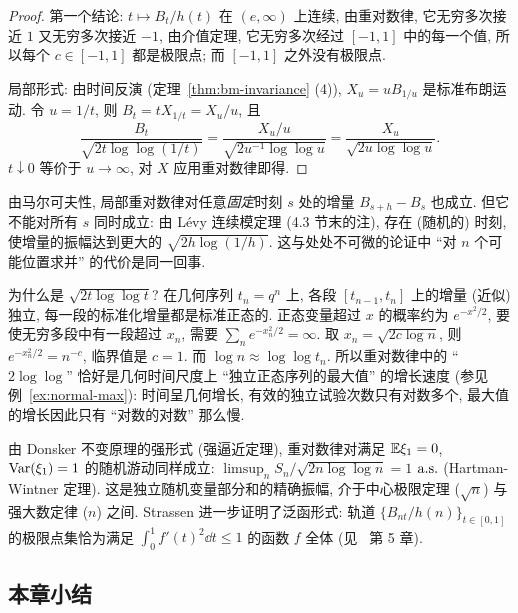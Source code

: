 \begin{proof}
第一个结论: $t\mapsto B_t/h(t)$ 在 $(e,\infty)$ 上连续, 由重对数律, 它无穷多次接近 $1$ 又无穷多次接近 $-1$, 由介值定理, 它无穷多次经过 $[-1,1]$ 中的每一个值, 所以每个 $c\in[-1,1]$ 都是极限点; 而 $[-1,1]$ 之外没有极限点.

局部形式: 由时间反演 (定理~\ref{thm:bm-invariance} (4)), $X_u=uB_{1/u}$ 是标准布朗运动. 令 $u=1/t$, 则 $B_t=tX_{1/t}=X_u/u$, 且
\[
\frac{B_t}{\sqrt{2t\log\log(1/t)}}=\frac{X_u/u}{\sqrt{2u^{-1}\log\log u}}=\frac{X_u}{\sqrt{2u\log\log u}}.
\]
$t\downarrow0$ 等价于 $u\to\infty$, 对 $X$ 应用重对数律即得.
\end{proof}

由马尔可夫性, 局部重对数律对任意\emph{固定}时刻 $s$ 处的增量 $B_{s+h}-B_s$ 也成立. 但它不能对所有 $s$ 同时成立: 由 L\'evy 连续模定理 (4.3 节末的注), 存在 (随机的) 时刻, 使增量的振幅达到更大的 $\sqrt{2h\log(1/h)}$. 这与处处不可微的论证中 ``对 $n$ 个可能位置求并'' 的代价是同一回事.

\begin{intuition}
为什么是 $\sqrt{2t\log\log t}$? 在几何序列 $t_n=q^n$ 上, 各段 $[t_{n-1},t_n]$ 上的增量 (近似) 独立, 每一段的标准化增量都是标准正态的. 正态变量超过 $x$ 的概率约为 $e^{-x^2/2}$, 要使无穷多段中有一段超过 $x_n$, 需要 $\sum_ne^{-x_n^2/2}=\infty$. 取 $x_n=\sqrt{2c\log n}$, 则 $e^{-x_n^2/2}=n^{-c}$, 临界值是 $c=1$. 而 $\log n\approx\log\log t_n$. 所以重对数律中的 ``$2\log\log$'' 恰好是几何时间尺度上 ``独立正态序列的最大值'' 的增长速度 (参见例~\ref{ex:normal-max}): 时间呈几何增长, 有效的独立试验次数只有对数多个, 最大值的增长因此只有 ``对数的对数'' 那么慢.
\end{intuition}

\begin{remark}
由 Donsker 不变原理的强形式 (强逼近定理), 重对数律对满足 $\mathbb{E}\xi_1=0$, $\operatorname{Var}(\xi_1)=1$ 的随机游动同样成立: $\limsup_nS_n/\sqrt{2n\log\log n}=1$ $\text{a.s.}$ (Hartman-Wintner 定理). 这是独立随机变量部分和的精确振幅, 介于中心极限定理 ($\sqrt{n}$) 与强大数定律 ($n$) 之间. Strassen 进一步证明了泛函形式: 轨道 $\{B_{nt}/h(n)\}_{t\in[0,1]}$ 的极限点集恰为满足 $\int_0^1f'(t)^2\dd t\le1$ 的函数 $f$ 全体 (见~\cite{morters} 第 5 章).
\end{remark}

\subsection*{本章小结}

